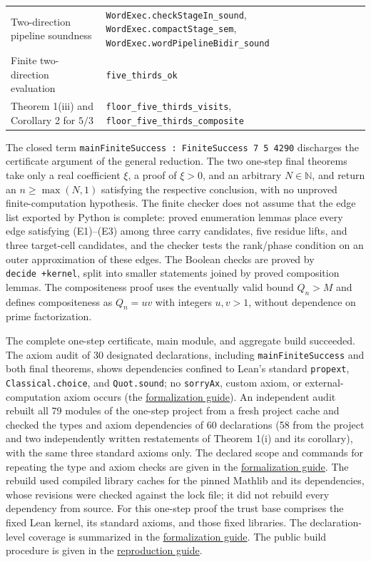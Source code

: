 \documentclass[11pt,reqno]{amsart}
\theoremstyle{definition}
\theoremstyle{remark}
\begin{document}
\begin{longtable}{@{}>{\raggedright\arraybackslash}p{} >{\raggedright\arraybackslash}p{}@{}}
Two-direction pipeline soundness & \nolinkurl{WordExec.checkStageIn_sound},\allowbreak{} \nolinkurl{WordExec.compactStage_sem},\allowbreak{} \nolinkurl{WordExec.wordPipelineBidir_sound} \\
Finite two-direction evaluation & \nolinkurl{five_thirds_ok} \\
Theorem 1(iii) and Corollary 2 for \(5/3\) & \nolinkurl{floor_five_thirds_visits},\allowbreak{} \nolinkurl{floor_five_thirds_composite} \\
\end{longtable}
\endgroup

The closed term \texttt{mainFiniteSuccess\ :\ FiniteSuccess\ 7\ 5\ 4290} discharges
the certificate argument of the general reduction. The two one-step final theorems
take only a real coefficient \(\xi\), a proof of \(\xi>0\), and an
arbitrary \(N\in\mathbb N\), and return an \(n\ge\max(N,1)\) satisfying
the respective conclusion, with no unproved finite-computation
hypothesis. The finite checker does not assume that the edge list
exported by Python is complete: proved enumeration lemmas place every
edge satisfying (E1)--(E3) among three carry candidates, five residue
lifts, and three target-cell candidates, and the checker tests the
rank/phase condition on an outer approximation of these edges. The
Boolean checks are proved by \texttt{decide\ +kernel}, split into smaller
statements joined by proved composition lemmas. The compositeness proof
uses the eventually valid bound \(Q_n>M\) and defines compositeness as
\(Q_n=uv\) with integers \(u,v>1\), without dependence on prime
factorization.

The complete one-step certificate, main module, and aggregate build succeeded.
The axiom audit of 30 designated declarations, including
\texttt{mainFiniteSuccess} and both final theorems, shows dependencies confined
to Lean's standard \texttt{propext}, \texttt{Classical.choice}, and \texttt{Quot.sound}; no
\texttt{sorryAx}, custom axiom, or external-computation axiom occurs
(the \href{supplement/FORMALIZATION.md}{formalization guide}). An independent audit
rebuilt all 79 modules of the one-step project from a fresh project cache and checked
the types and axiom dependencies of 60 declarations (58 from the project
and two independently written restatements of Theorem 1(i) and its
corollary), with the same three standard axioms only. The declared scope and
commands for repeating the type and axiom checks are given in the \href{supplement/FORMALIZATION.md}{formalization guide}.
The rebuild used compiled library caches for the pinned Mathlib and its
dependencies, whose revisions were checked against the lock file; it did
not rebuild every dependency from source. For this one-step proof the
trust base comprises the fixed Lean kernel, its standard axioms, and
those fixed libraries. The declaration-level coverage is summarized in the \href{supplement/FORMALIZATION.md}{formalization guide}.
The public build procedure is given in the \href{REPRODUCE.md}{reproduction guide}.
\end{document}
